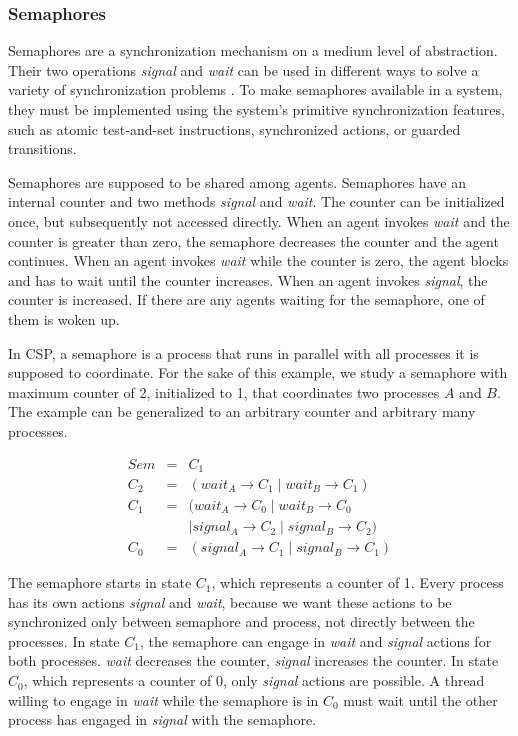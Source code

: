 \subsubsection{Semaphores}

Semaphores are a synchronization mechanism on a medium level of abstraction.
Their two operations \emph{signal} and \emph{wait} can be used in different ways to solve a variety of synchronization problems \cite{books/Downey08LBOS}.
To make semaphores available in a system, they must be implemented using the system's primitive synchronization features, such as atomic test-and-set instructions, synchronized actions, or guarded transitions.

Semaphores are supposed to be shared among agents.
Semaphores have an internal counter and two methods \emph{signal} and \emph{wait}.
The counter can be initialized once, but subsequently not accessed directly.
When an agent invokes \emph{wait} and the counter is greater than zero, the semaphore decreases the counter and the agent continues.
When an agent invokes \emph{wait} while the counter is zero, the agent blocks and has to wait until the counter increases.
When an agent invokes \emph{signal}, the counter is increased.
If there are any agents waiting for the semaphore, one of them is woken up.

In CSP, a semaphore is a process that runs in parallel with all processes it is supposed to coordinate.
For the sake of this example, we study a semaphore with maximum counter of 2, initialized to 1, that coordinates two processes $A$ and $B$.
The example can be generalized to an arbitrary counter and arbitrary many processes.

\begin{equation*}
  \begin{array}{rcl}
  Sem & = & C_1 \\
  C_2 & = & (wait_A \to C_1 \mid wait_B \to C_1) \\
  C_1 & = & (wait_A \to C_0 \mid wait_B \to C_0 \\
      &   & \mid signal_A \to C_2 \mid signal_B \to C_2) \\
  C_0 & = & (signal_A \to C_1 \mid signal_B \to C_1)
  \end{array}
\end{equation*}

The semaphore starts in state $C_1$, which represents a counter of 1.
Every process has its own actions \emph{signal} and \emph{wait}, because we want these actions to be synchronized only between semaphore and process, not directly between the processes.
In state $C_1$, the semaphore can engage in \emph{wait} and \emph{signal} actions for both processes.
\emph{wait} decreases the counter, \emph{signal} increases the counter.
In state $C_0$, which represents a counter of 0, only \emph{signal} actions are possible.
A thread willing to engage in \emph{wait} while the semaphore is in $C_0$ must wait until the other process has engaged in \emph{signal} with the semaphore.


